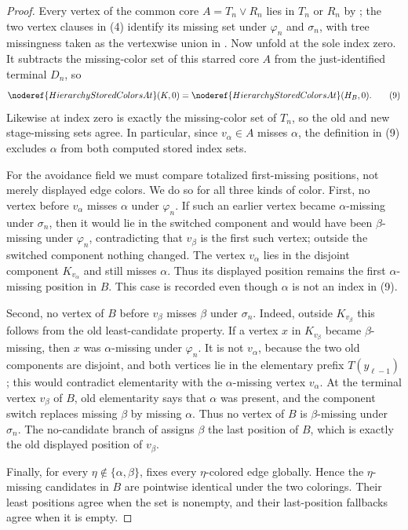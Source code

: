 \begin{proof}
Every vertex of the common core $A=T_n\vee R_n$ lies in $T_n$ or $R_n$ by
; the two vertex clauses in (4) identify its
missing set under $\varphi_n$ and $\sigma_n$, with tree missingness taken as
the vertexwise union in .  Now unfold
 at the sole index zero.  It subtracts the
missing-color set of this starred core $A$ from the just-identified terminal
$D_n$, so
\[
       \noderef{HierarchyStoredColorsAt}(K,0)
       =\noderef{HierarchyStoredColorsAt}(H_B,0).               \tag{9}
\]
Likewise  at index zero is exactly the
missing-color set of $T_n$, so the old and new stage-missing sets agree.
In particular, since $v_\alpha\in A$ misses $\alpha$, the definition in
(9) excludes $\alpha$ from both computed stored index sets.

For the avoidance field we must compare totalized first-missing positions,
not merely displayed edge colors.  We do so for all three kinds of color.
First, no vertex before $v_\alpha$ misses $\alpha$ under $\varphi_n$.  If
such an earlier vertex became $\alpha$-missing under $\sigma_n$, then it
would lie in the switched component and would have been $\beta$-missing
under $\varphi_n$, contradicting that $v_\beta$ is the first such vertex;
outside the switched component nothing changed.  The vertex $v_\alpha$
lies in the disjoint component $K_{v_\alpha}$ and still misses $\alpha$.
Thus its displayed position remains the first $\alpha$-missing position in
$B$.  This case is recorded even though $\alpha$ is not an index in (9).

Second, no vertex of $B$ before $v_\beta$ misses $\beta$ under
$\sigma_n$.  Indeed, outside $K_{v_\beta}$ this follows from the old
least-candidate property.  If a vertex $x$ in $K_{v_\beta}$ became
$\beta$-missing, then $x$ was $\alpha$-missing under $\varphi_n$.  It is
not $v_\alpha$, because the two old components are disjoint, and both
vertices lie in the elementary prefix $T(y_{\ell-1})$; this would contradict
elementarity with the $\alpha$-missing vertex $v_\alpha$.  At the terminal
vertex $v_\beta$ of $B$, old elementarity says that $\alpha$ was present,
and the component switch replaces missing $\beta$ by missing $\alpha$.
Thus no vertex of $B$ is $\beta$-missing under $\sigma_n$.  The no-candidate
branch of  assigns $\beta$ the last
position of $B$, which is exactly the old displayed position of
$v_\beta$.

Finally, for every $\eta\notin\{\alpha,\beta\}$,
 fixes every $\eta$-colored edge globally.
Hence the $\eta$-missing candidates in $B$ are pointwise identical under
the two colorings.  Their least positions agree when the set is nonempty,
and their last-position fallbacks agree when it is empty.


\end{proof}
